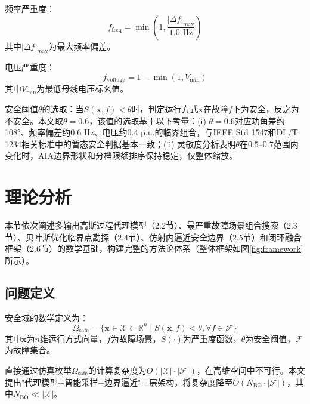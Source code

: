 \documentclass[a4paper,11pt]{ctexart}
\newcommand{\bx}{\mathbf{x}}
\begin{document}
频率严重度：
\begin{equation}
    f_{\text{freq}} = \min\left(1, \frac{|\Delta f|_{\max}}{1.0 \text{ Hz}}\right)
    \label{eq:f_freq}
\end{equation}
其中$|\Delta f|_{\max}$为最大频率偏差。

电压严重度：
\begin{equation}
    f_{\text{voltage}} = 1 - \min(1, V_{\min})
    \label{eq:f_voltage}
\end{equation}
其中$V_{\min}$为最低母线电压标幺值。

安全阈值$\theta$的选取：当$S(\bx, f) < \theta$时，判定运行方式$\bx$在故障$f$下为安全，反之为不安全。本文取$\theta = 0.6$，该值的选取基于以下考量：(i) $\theta = 0.6$对应功角差约108°、频率偏差约0.6 Hz、电压约0.4 p.u.的临界组合，与IEEE Std 1547和DL/T 1234相关标准中的暂态安全判据基本一致；(ii) 灵敏度分析表明$\theta$在0.5--0.7范围内变化时，AIA边界形状和分档限额排序保持稳定，仅整体缩放。

\section{理论分析}
\label{sec:theory}

本节依次阐述多输出高斯过程代理模型（2.2节）、最严重故障场景组合搜索（2.3节）、贝叶斯优化临界点勘探（2.4节）、仿射内逼近安全边界（2.5节）和闭环融合框架（2.6节）的数学基础，构建完整的方法论体系（整体框架如图\ref{fig:framework}所示）。

\subsection{问题定义}
\label{subsec:problem}

安全域的数学定义为：
\begin{equation}
    \Omega_{\text{safe}} = \{\bx \in \mathcal{X} \subset \mathbb{R}^n \mid S(\bx, f) < \theta, \forall f \in \mathcal{F}\}
    \label{eq:safe_set}
\end{equation}
其中$\bx$为$n$维运行方式向量，$f$为故障场景，$S(\cdot)$为严重度函数，$\theta$为安全阈值，$\mathcal{F}$为故障集合。

直接通过仿真枚举$\Omega_{\text{safe}}$的计算复杂度为$O(|\mathcal{X}| \cdot |\mathcal{F}|)$，在高维空间中不可行。本文提出"代理模型+智能采样+边界逼近"三层架构，将复杂度降至$O(N_{\text{BO}} \cdot |\mathcal{F}|)$，其中$N_{\text{BO}} \ll |\mathcal{X}|$。
\end{document}
